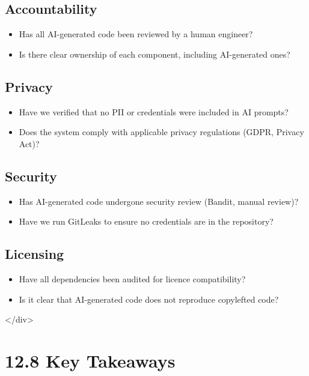 \documentclass[11pt,a4paper]{book}
\begin{document}
\subsection{Accountability}
\begin{itemize}
  \item [ ] Has all AI-generated code been reviewed by a human engineer?
  \item [ ] Is there clear ownership of each component, including AI-generated ones?
\end{itemize}

\subsection{Privacy}
\begin{itemize}
  \item [ ] Have we verified that no PII or credentials were included in AI prompts?
  \item [ ] Does the system comply with applicable privacy regulations (GDPR, Privacy Act)?
\end{itemize}

\subsection{Security}
\begin{itemize}
  \item [ ] Has AI-generated code undergone security review (Bandit, manual review)?
  \item [ ] Have we run GitLeaks to ensure no credentials are in the repository?
\end{itemize}

\subsection{Licensing}
\begin{itemize}
  \item [ ] Have all dependencies been audited for licence compatibility?
  \item [ ] Is it clear that AI-generated code does not reproduce copylefted code?
\end{itemize}
</div>

\medskip

\section{12.8 Key Takeaways}
\end{document}

